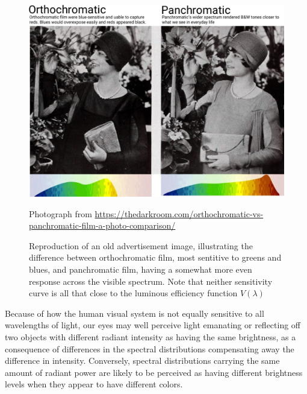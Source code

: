 \begin{figure}
	{
		\hfill
		\includegraphics[width=.8\linewidth]{figures_built/Orthochromatic-Panchromatic-film-1024x768-1.jpg}
		\hfill
	}	
	
	\caption{\label{fig:orthopanphoto}
		Reproduction of an old advertisement image, illustrating the difference between
		orthochromatic film, most sentitive to greens and blues, and panchromatic film,
		having a somewhat more even response across the visible spectrum. 
		Note that neither sensitivity curve is all that close to the luminous efficiency
		function $V(\lambda)$}
	{\scriptsize\hfill
		Photograph from \url{https://thedarkroom.com/orthochromatic-vs-panchromatic-film-a-photo-comparison/}
	}
\end{figure}

Because of how the human visual system is not equally sensitive to all wavelengths
of light, our eyes may well perceive light emanating or reflecting 
off two objects with different radiant intensity as having the same brightness, 
as a consequence of differences in the spectral distributions compensating 
away the difference in intensity. 
Conversely, \glspl{spectral distribution} carrying the same amount
of radiant power are likely to be perceived as having different brightness levels 
when they appear to have different colors.

